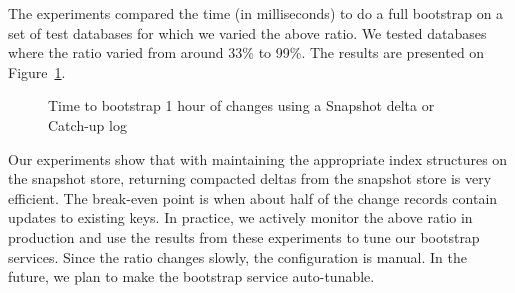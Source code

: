 The experiments compared the time (in milliseconds) to do a full bootstrap on a set of test databases for which we varied the above ratio. We tested databases where the ratio varied from around 33\% to 99\%. The results are presented on Figure~\ref{fig:snapshot_vs_catchup}. 

\begin{figure}
\centering
{}
\caption{Time to bootstrap 1 hour of changes using a Snapshot delta or Catch-up log}
\label{fig:snapshot_vs_catchup}
\end{figure}

Our experiments show that with maintaining the appropriate index structures on the snapshot store, returning compacted deltas from the snapshot store is very efficient. The break-even point is when about half of the change records contain updates to existing keys. In practice, we actively monitor the above ratio in production and use the results from these experiments to tune our bootstrap services. Since the ratio changes slowly, the configuration is manual. In the future, we plan to make the bootstrap service auto-tunable.



